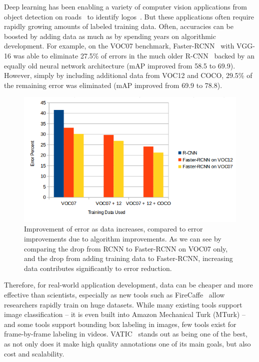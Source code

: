 Deep learning has been enabling a variety of computer vision applications from object detection on roads~\cite{road-obj-detection} to identify logos~\cite{logos}.
But these applications often require rapidly growing amounts of labeled training data.
Often, accuracies can be boosted by adding data as much as by spending years on algorithmic development.
For example, on the VOC07 benchmark, Faster-RCNN~\cite{FasterRCNN} with VGG-16 was able to eliminate 27.5\% of errors in the much older R-CNN~\cite{RCNN} backed by an equally old neural network architecture (mAP improved from 58.5 to 69.9).
However, simply by including additional data from VOC12 and COCO, 29.5\% of the remaining error was eliminated (mAP improved from 69.9 to 78.8).

\begin{figure}[h]
\includegraphics[width=14cm]{figs/data_vs_error.png}
\centering
\caption{Improvement of error as data increases, compared to error improvements due to algorithm improvements.
As we can see by comparing the drop from RCNN to Faster-RCNN on VOC07 only, and the drop from adding training data to Faster-RCNN, increasing data contributes significantly to error reduction.}
\end{figure}

Therefore, for real-world application development, data can be cheaper and more effective than scientists, especially as new tools such as FireCaffe~\cite{firecaffe} allow researchers rapidly train on huge datasets.
While many existing tools support image classification -- it is even built into Amazon Mechanical Turk (MTurk) -- and some tools support bounding box labeling in images, few tools exist for frame-by-frame labeling in videos.
VATIC~\cite{Vatic} stands out as being one of the best, as not only does it make high quality annotations one of its main goals, but also cost and scalability.

